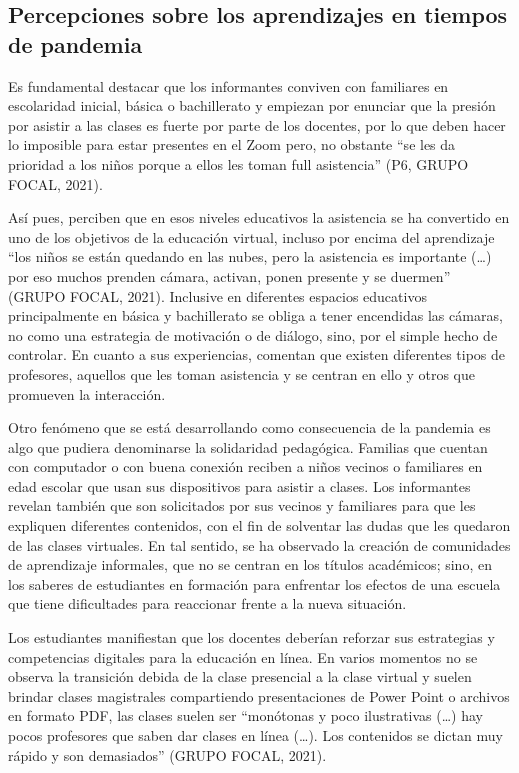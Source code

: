 \documentclass[spanish]{textolivre}
\begin{document}
\subsection{Percepciones sobre los aprendizajes en tiempos de pandemia}\label{sec-formato}
Es fundamental destacar que los informantes conviven con familiares en escolaridad inicial, básica o bachillerato y empiezan por enunciar que la presión por asistir a las clases es fuerte por parte de los docentes, por lo que deben hacer lo imposible para estar presentes en el Zoom pero, no obstante “se les da prioridad a los niños porque a ellos les toman full asistencia” (P6, GRUPO FOCAL, 2021). 

Así pues, perciben que en esos niveles educativos la asistencia se ha convertido en uno de los objetivos de la educación virtual, incluso por encima del aprendizaje “los niños se están quedando en las nubes, pero la asistencia es importante (…) por eso muchos prenden cámara, activan, ponen presente y se duermen” (GRUPO FOCAL, 2021). Inclusive en diferentes espacios educativos principalmente en básica y bachillerato se obliga a tener encendidas las cámaras, no como una estrategia de motivación o de diálogo, sino, por el simple hecho de controlar. En cuanto a sus experiencias, comentan que existen diferentes tipos de profesores, aquellos que les toman asistencia y se centran en ello y otros que promueven la interacción.

Otro fenómeno que se está desarrollando como consecuencia de la pandemia es algo que pudiera denominarse la solidaridad pedagógica. Familias que cuentan con computador o con buena conexión reciben a niños vecinos o familiares en edad escolar que usan sus dispositivos para asistir a clases. Los informantes revelan también que son solicitados por sus vecinos y familiares para que les expliquen diferentes contenidos, con el fin de solventar las dudas que les quedaron de las clases virtuales. En tal sentido, se ha observado la creación de comunidades de aprendizaje informales, que no se centran en los títulos académicos; sino, en los saberes de estudiantes en formación para enfrentar los efectos de una escuela que tiene dificultades para reaccionar frente a la nueva situación.

Los estudiantes manifiestan que los docentes deberían reforzar sus estrategias y competencias digitales para la educación en línea. En varios momentos no se observa la transición debida de la clase presencial a la clase virtual y suelen brindar clases magistrales compartiendo presentaciones de Power Point o archivos en formato PDF, las clases suelen ser “monótonas y poco ilustrativas (…) hay pocos profesores que saben dar clases en línea (…). Los contenidos se dictan muy rápido y son demasiados” (GRUPO FOCAL, 2021).
\end{document}
